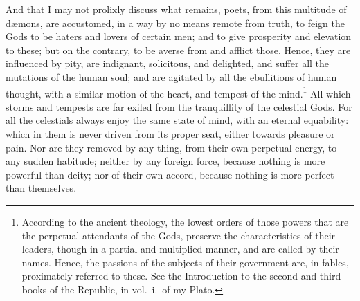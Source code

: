 \documentclass{article}
\begin{document}
\noindent And that I may not prolixly discuss what remains, poets, from this
multitude of d{\ae}mons, are accustomed, in a way by no means remote from
truth, to feign the Gods to be haters and lovers of certain men; and to give
prosperity and elevation to these; but on the contrary, to be averse from and
afflict those. Hence, they are influenced by pity, are indignant, solicitous,
and delighted, and suffer all the mutations of the human soul; and are agitated
by all the ebullitions of human thought, with a similar motion of the heart,
and tempest of the mind.\footnote{According to the ancient theology, the lowest
orders of those powers that are the perpetual attendants of the Gods, preserve
the characteristics of their leaders, though in a partial and multiplied
manner, and are called by their names. Hence, the passions of the subjects of
their government are, in fables, proximately referred to these. See the
Introduction to the second and third books of the Republic, in
vol.~i.~of my Plato.} All which storms and tempests are far exiled
from the tranquillity of the celestial Gods. For all the celestials always
enjoy the same state of mind, with an eternal equability: which in them is
never driven from its proper seat, either towards pleasure or pain. Nor are
they removed by any thing, from their own perpetual energy, to any sudden
habitude; neither by any foreign force, because nothing is more powerful than
deity; nor of their own accord, because nothing is more perfect than
themselves.
\end{document}
